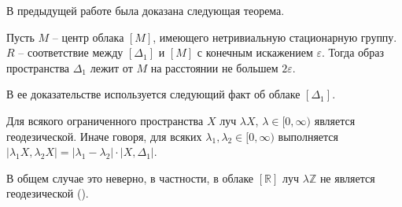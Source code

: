 В предыдущей работе была доказана следующая теорема.
\begin{theorem}
	Пусть $M$ -- центр облака $[M]$, имеющего нетривиальную
	стационарную группу. $R$ -- соответствие между $[\Delta_{1}]$ и $[M]$ с конечным
	искажением $\varepsilon$. Тогда образ пространства $\Delta_{1}$ лежит от $M$ на
	расстоянии не большем $2 \varepsilon $.
	\label{thrmCenterImage}
\end{theorem}
В ее доказательстве используется следующий факт об облаке \( [\Delta _1] \).
\begin{theorem}
    Для всякого ограниченного пространства \( X \) луч \( \lambda X \), \(
    \lambda \in [0,\infty ) \) является геодезической. Иначе говоря, для всяких
    \( \lambda _1, \lambda _2 \in [0,\infty) \) выполняется \(| \lambda _1 X,
    \lambda _2 X| = | \lambda _1 - \lambda _2 | \cdot | X, \Delta _1 |\).
\end{theorem}
В общем случае это неверно, в частности, в облаке \( [\mathbb{R}]
\) луч \( \lambda \mathbb{Z} \) не является геодезической
(\cite{mikhailov2025newgeodesiclinesgromovhausdorff}).
